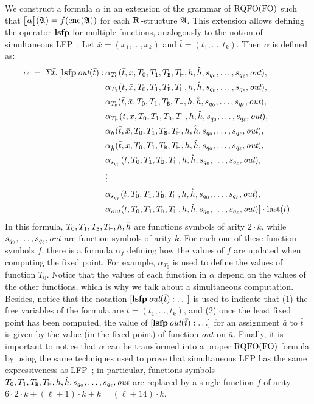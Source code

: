 We construct a formula $\alpha$ in an extension of the grammar of ${\rm RQFO}({\rm FO})$ such that ${\llbracket{}{\alpha}\rrbracket}(\mathfrak{A}) = f({\rm enc}(\mathfrak{A}))$ for each $\mathbf{R}$-structure $\mathfrak{A}$. This extension allows defining the operator ${\bf lsfp}$ for multiple functions, analogously to the notion of simultaneous LFP~\cite{L04}.
Let $\bar{x} = (x_1,\ldots,x_k)$ and $\bar{t} = (t_1,\ldots,t_k)$. Then $\alpha$ is defined as:
\begin{align*}
\alpha \ = \ \Sigma{\bar{t}}.\,[{\bf lsfp} \, \text{\it out}(\bar{t}): \,&\alpha_{T_0}(\bar{t},\bar{x},T_0,T_1,T_{\mathtt{B}},T_{\vdash},h,\hat{h},s_{q_0},\ldots,s_{q_{\ell}},\text{\it out}),\\
	&\alpha_{T_1}(\bar{t},\bar{x},T_0,T_1,T_{\mathtt{B}},T_{\vdash},h,\hat{h},s_{q_0},\ldots,s_{q_{\ell}},\text{\it out}),\\
	&\alpha_{T_{\mathtt{B}}}(\bar{t},\bar{x},T_0,T_1,T_{\mathtt{B}},T_{\vdash},h,\hat{h},s_{q_0},\ldots,s_{q_{\ell}},\text{\it out}),\\
	&\alpha_{T_{\vdash}}(\bar{t},\bar{x},T_0,T_1,T_{\mathtt{B}},T_{\vdash},h,\hat{h},s_{q_0},\ldots,s_{q_{\ell}},\text{\it out}),\\
	&\alpha_{h}(\bar{t},\bar{x},T_0,T_1,T_{\mathtt{B}},T_{\vdash},h,\hat{h},s_{q_0},\ldots,s_{q_{\ell}},\text{\it out}),\\
	&\alpha_{\hat{h}}(\bar{t},\bar{x},T_0,T_1,T_{\mathtt{B}},T_{\vdash},h,\hat{h},s_{q_0},\ldots,s_{q_{\ell}},\text{\it out}),\\
	&\alpha_{s_{q_0}}(\bar{t},T_0,T_1,T_{\mathtt{B}},T_{\vdash},h,\hat{h},s_{q_0},\ldots,s_{q_{\ell}},\text{\it out}),\\
	&\vdots \\
	&\alpha_{s_{q_{\ell}}}(\bar{t},T_0,T_1,T_{\mathtt{B}},T_{\vdash},h,\hat{h},s_{q_0},\ldots,s_{q_{\ell}},\text{\it out}),\\
	&\alpha_{\text{\it out}}(\bar{t},T_0,T_1,T_{\mathtt{B}},T_{\vdash},h,\hat{h},s_{q_0},\ldots,s_{q_{\ell}},\text{\it out})]\cdot \operatorname{last}(\bar{t}).
\end{align*}
In this formula, $T_0,T_1,T_{\mathtt{B}},T_{\vdash},h,\hat{h}$ are functions symbols of arity $2 \cdot k$, while $s_{q_0},\ldots,s_{q_{\ell}},\text{\it out}$ are function symbols of arity $k$. For each one of these function symbols $f$, there is a formula $\alpha_f$ defining how the values of $f$ are updated when computing the fixed point. For example, $\alpha_{T_0}$ is used to define the values of function $T_0$. Notice that the values of each function in $\alpha$ depend on the values of the other functions, which is why we talk about a simultaneous computation. Besides, notice that the notation $[{\bf lsfp} \, \text{\it out}(\bar{t}) : \ldots]$ is used to indicate that (1) the free variables of the formula are $\bar t = (t_1, \ldots, t_k)$, and (2) once the least fixed point has been computed, the value of $[{\bf lsfp} \, \text{\it out}(\bar{t}) : \ldots]$ for an assignment $\bar a$ to $\bar t$ is given by the value (in the fixed point) of function $\text{\it out}$  on $\bar a$. Finally, it is important to notice that $\alpha$ can be transformed into a proper ${\rm RQFO}({\rm FO})$ formula by using the same techniques used to prove that simultaneous LFP has the same expressiveness as LFP~\cite{L04}; in particular, functions symbols $T_0,T_1,T_{\mathtt{B}},T_{\vdash},h,\hat{h},s_{q_0},\ldots,s_{q_{\ell}},\text{\it out}$ are replaced by a single function $f$ of arity $6 \cdot 2 \cdot k + (\ell + 1) \cdot k + k = (\ell+ 14) \cdot k$.

